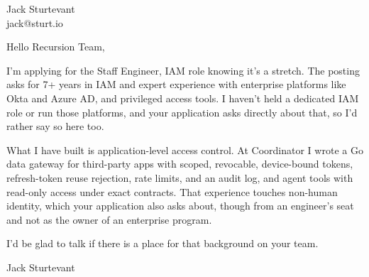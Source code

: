 \documentclass[11pt]{article}
\begin{document}
\raggedright

{\namefont\fontsize{20pt}{24pt}\selectfont Jack Sturtevant}\\[-0.3em]
jack@sturt.io

\vspace{1.2em}

Hello Recursion Team,

I'm applying for the Staff Engineer, IAM role knowing it's a stretch. The posting asks for 7+ years in IAM and expert experience with enterprise platforms like Okta and Azure AD, and privileged access tools. I haven't held a dedicated IAM role or run those platforms, and your application asks directly about that, so I'd rather say so here too.

What I have built is application-level access control. At Coordinator I wrote a Go data gateway for third-party apps with scoped, revocable, device-bound tokens, refresh-token reuse rejection, rate limits, and an audit log, and agent tools with read-only access under exact contracts. That experience touches non-human identity, which your application also asks about, though from an engineer's seat and not as the owner of an enterprise program.

I'd be glad to talk if there is a place for that background on your team.

\vspace{0.6em}
Jack Sturtevant
\end{document}
